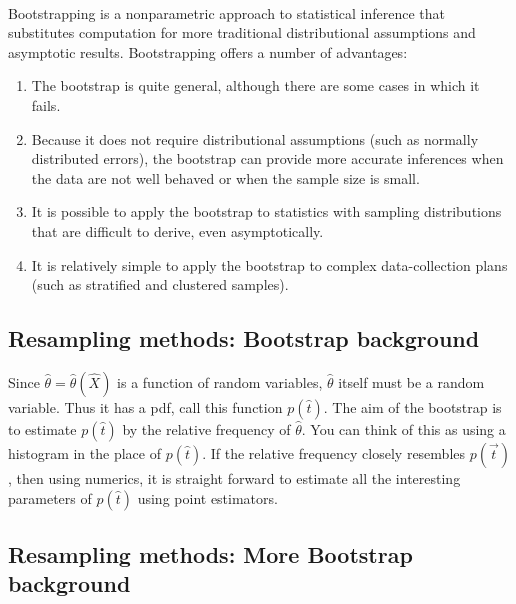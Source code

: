 \documentclass[%
oneside,                 %
final,                   %
10pt]{article}
\begin{document}
\paragraph{}
Bootstrapping is a nonparametric approach to statistical inference
that substitutes computation for more traditional distributional
assumptions and asymptotic results. Bootstrapping offers a number of
advantages: 
\begin{enumerate}
\item The bootstrap is quite general, although there are some cases in which it fails.  

\item Because it does not require distributional assumptions (such as normally distributed errors), the bootstrap can provide more accurate inferences when the data are not well behaved or when the sample size is small.  

\item It is possible to apply the bootstrap to statistics with sampling distributions that are difficult to derive, even asymptotically. 

\item It is relatively simple to apply the bootstrap to complex data-collection plans (such as stratified and clustered samples).
\end{enumerate}

\noindent



\subsection*{Resampling methods: Bootstrap background}

Since $\widehat{\theta} = \widehat{\theta}(\hat{X})$ is a function of random variables,
$\widehat{\theta}$ itself must be a random variable. Thus it has
a pdf, call this function $p(\hat{t})$. The aim of the bootstrap is to
estimate $p(\hat{t})$ by the relative frequency of
$\widehat{\theta}$. You can think of this as using a histogram
in the place of $p(\hat{t})$. If the relative frequency closely
resembles $p(\vec{t})$, then using numerics, it is straight forward to
estimate all the interesting parameters of $p(\hat{t})$ using point
estimators.  

\subsection*{Resampling methods: More Bootstrap background}
\end{document}
